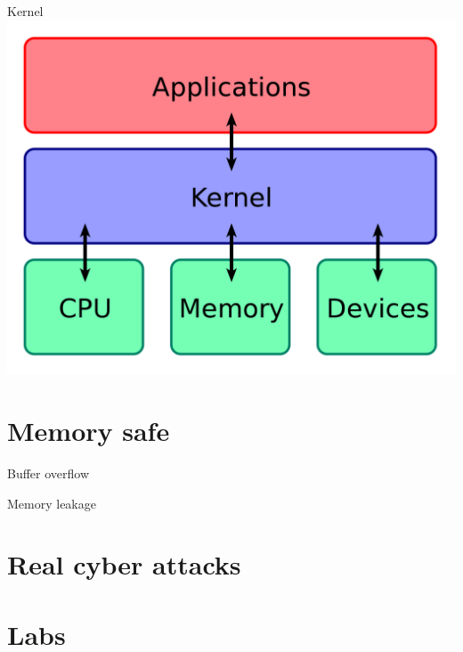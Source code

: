 \documentclass{beamer}
\begin{document}
\begin{CJK*}{UTF8}{bsmi}
    \begin{frame}{Kernel}
        \includegraphics[width=\textwidth]{Kernel_Layout.svg.png}
    \end{frame}

    \section{Memory safe}
    \begin{frame}{Buffer overflow}

    \end{frame}

    \begin{frame}{Memory leakage}

    \end{frame}



    \section{Real cyber attacks}
    \begin{frame}{}

    \end{frame}

    \section{Labs}


\end{CJK*}
\end{document}
